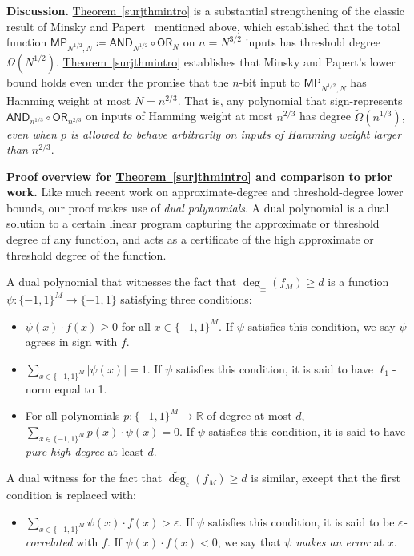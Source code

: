 \documentclass[11pt]{article}
\numberwithin{equation}{section}
\theoremstyle{definition}
\theoremstyle{plain}
\newcommand{\R}{\mathbb R}
\newcommand{\expref}[2]{\hyperref[#2]{#1~\ref{#2}}}
\newcommand{\OR}{\mathsf{ OR}}
\newcommand{\bits}{\{-1,1\}}
\newcommand{\eps}{\varepsilon}
\newcommand{\adeg}{\widetilde{\operatorname{deg}}}
\newcommand{\AND}{\mathsf{AND}}
\begin{document}
\noindent \textbf{Discussion.}
\expref{Theorem}{surjthmintro} is a substantial strengthening of the classic result
of Minsky and Papert~\cite{mp} mentioned above, %
which established that the total function $\mathsf{MP}_{N^{1/2}, N} \coloneqq  \AND_{N^{1/2}} \circ \OR_N$ on $n=N^{3/2}$
inputs has threshold
degree $\Omega(N^{1/2})$. %
\expref{Theorem}{surjthmintro} establishes that Minsky and Papert's lower bound holds even under the promise that the $n$-bit input to $\mathsf{MP}_{N^{1/2}, N}$
has Hamming weight at most $N=n^{2/3}$. That is, any polynomial that sign-represents $\AND_{n^{1/3}} \circ \OR_{n^{2/3}}$ on inputs
of Hamming weight at most $n^{2/3}$
has degree $\tilde{\Omega}(n^{1/3})$, \emph{even when $p$ is allowed to behave arbitrarily on inputs of Hamming weight larger than $n^{2/3}$}. 

\medskip 
\noindent \textbf{Proof overview for \expref{Theorem}{surjthmintro} and comparison to prior work.}
Like much recent work on %
%
approxi\-mate-degree and threshold-degree %
 lower bounds, our proof makes 
use of \emph{dual polynomials}. A dual polynomial is a dual solution to a certain linear program capturing the approximate or threshold degree of any function,
and acts as a certificate of the high approximate or threshold degree of the function.

A dual polynomial that witnesses the fact that $\deg_{\pm}(f_M) \geq d$ is a 
function $\psi \colon \bits^M \to \bits$ satisfying three 
%
conditions:%
\begin{itemize}
	\item $\psi(x) \cdot f(x) \geq 0$ for all $x \in \bits^M$. If $\psi$ satisfies this condition, we say $\psi$
	agrees in sign with $f$. 
	\item  $\sum_{x \in \bits^M} |\psi(x)| = 1$. If $\psi$ satisfies this condition, it is said to have $\ell_1$-norm equal to 1.
	\item For all polynomials $p \colon \bits^M \to \R$ of degree at most $d$, $\sum_{x \in \bits^M} p(x) \cdot \psi(x) = 0$. 
	If $\psi$ satisfies this condition, it is said to have \emph{pure high degree} at least $d$.
\end{itemize}
A dual witness for the fact that $\adeg_{\eps}(f_M) \geq d$ is similar, except that the first condition is replaced
with:
\begin{itemize}
	\item $\sum_{x \in \bits^M}\psi(x) \cdot f(x) > \eps$. If $\psi$ satisfies this condition, it is said to be \emph{$\eps$-correlated} with $f$.
	If $\psi(x) \cdot f(x) < 0$, we say that $\psi$ \emph{makes an error} at $x$.
\end{itemize}
\end{document}
